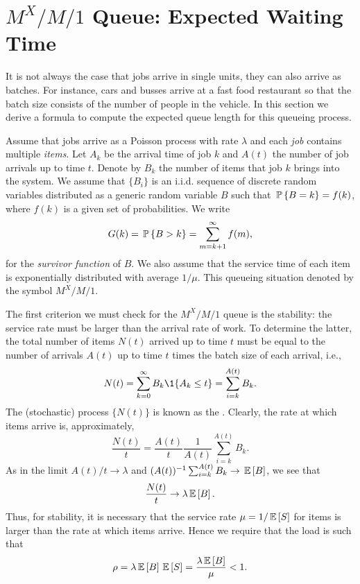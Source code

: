 \section
[$M^X/M/1$ Queue: Expected Waiting Time]
{$M^X/M/1$ Queue: Expected Waiting Time}
\label{sec:mxm1-queue:-expected}

It is not always the case that jobs arrive in single units, they can
also arrive as batches. For instance, cars and busses arrive at a fast
food restaurant so that the batch size consists of the number of
people in the vehicle.  In this section we derive a formula to compute
the expected queue length for this queueing process. 


Assume that jobs arrive as a Poisson process with rate $\lambda$ and
each \emph{job} contains multiple \emph{items}.  Let $A_k$ be the
arrival time of job $k$ and $A(t)$ the number of job arrivals up to
time $t$. Denote by $B_k$ the number of items that job $k$ brings into
the system.  We assume that $\{B_i\}$ is an i.i.d. sequence of
discrete random variables distributed as a generic random variable $B$
such that $\P{B = k} = f(k)$, where $f(k)$ is a given set of
probabilities. We write
\begin{equation*}
  G(k) = \P{B>k} = \sum_{m=k+1}^\infty f(m),
\end{equation*}
for the \emph{survivor function} of $B$.  We also assume that the
service time of each item is exponentially distributed with average
$1/\mu$. This queueing situation denoted by the symbol $M^X/M/1$.

The first criterion we must check for the $M^X/M/1$ queue is the
stability: the service rate must be larger than the arrival rate of
work. To determine the latter, the total number of items $N(t)$
arrived up to time $t$ must be equal to the number of arrivals $A(t)$
up to time $t$ times the batch size of each arrival, i.e.,
\begin{equation*}
N(t)=  \sum_{k=0}^\infty B_k \1{A_k \leq t} = \sum_{i=k}^{A(t)} B_k.
\end{equation*}
The (stochastic) process $\{N(t)\}$ is known as the . Clearly, the rate at which items arrive is,
approximately,
\begin{equation*}
  \frac{N(t)}t = \frac{A(t)}t \frac1{A(t)}\sum_{i=k}^{A(t)} B_k.
\end{equation*}
As in  the limit $A(t)/t \to \lambda$ and $(A(t))^{-1}\sum_{i=k}^{A(t)} B_k \to \E{B}$, we see that
\begin{align*}
\frac{N(t)}t \to \lambda \E B.
\end{align*}
Thus, for stability, it is necessary that the service rate
$\mu=1/\E S$ for items is larger than the rate at which items
arrive. Hence we require that the load is such that
\begin{equation*}
\rho = \lambda \E B \E S = \frac{\lambda \E B} \mu < 1.
\end{equation*}

